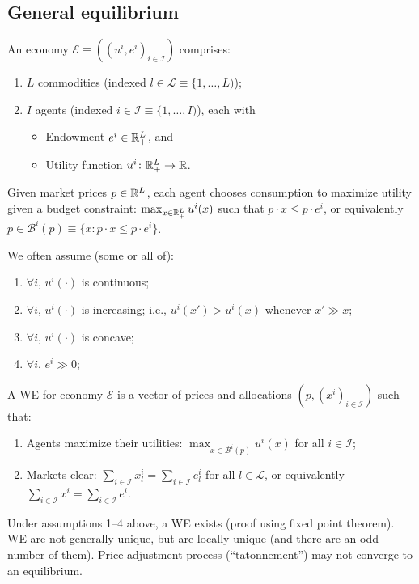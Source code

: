 \documentclass[8pt,letterpaper, landscape]{extarticle} %
\begin{document}
\begin{multicols}{3}
\begin{description}
\subsection{General equilibrium}
 An economy $ \mathcal{E} \equiv ((u^{i}, e^{i})_{i \in \mathcal{I}}) $ comprises:
\begin{enumerate}
\item $ L $ commodities (indexed $ l \in \mathcal{L} \equiv \{ 1, \dotsc , L) $);
\item $ I $ agents (indexed $ i \in \mathcal{I} \equiv \{ 1, \dotsc , I) $), each with
\begin{itemize}
\item Endowment $ e^i \in \mathbb{R}^L_+ $, and
\item Utility function $ u^i \colon \mathbb{R}^L_+ \to \mathbb{R} $.
\end{itemize}
\end{enumerate}
Given market prices $ p \in \mathbb{R}^L_+ $, each agent chooses consumption to maximize utility given a budget constraint: $ \max_{x \in \mathbb{R}^L_+} u^i(x) $ such that $ p \cdot x \leq p \cdot e^i $, or equivalently $ p \in \mathcal{B}^i(p) \equiv \{ x \colon p \cdot x \leq p \cdot e^i \} $.

We often assume (some or all of):
\begin{enumerate}
\item $ \forall i $, $ u^i (\cdot) $ is continuous;
\item $ \forall i $, $ u^i (\cdot) $ is increasing; i.e., $ u^i(x') > u^i(x) $ whenever $ x' \gg x $;
\item $ \forall i $, $ u^i (\cdot) $ is concave;
\item $ \forall i $, $ e^i \gg 0 $;
\end{enumerate}

 A WE for economy $ \mathcal{E} $ is a vector of prices and allocations $ (p, (x^i)_{i \in \mathcal{I}}) $ such that:
\begin{enumerate}
\item Agents maximize their utilities: $ \max_{x \in \mathcal{B}^i(p)} u^i(x) $ for all $ i \in \mathcal{I} $;
\item Markets clear: $ \sum_{i \in \mathcal{I}} x^i_l = \sum_{i \in \mathcal{I}} e^i_l $ for all $ l \in \mathcal{L} $, or equivalently $ \sum_{i \in \mathcal{I}} x^i = \sum_{i \in \mathcal{I}} e^i $.
\end{enumerate}
Under assumptions 1--4 above, a WE exists (proof using fixed point theorem). WE are not generally unique, but are locally unique (and there are an odd number of them). Price adjustment process (``tatonnement'') may not converge to an equilibrium.


\end{description}
\end{multicols}
\end{document}
